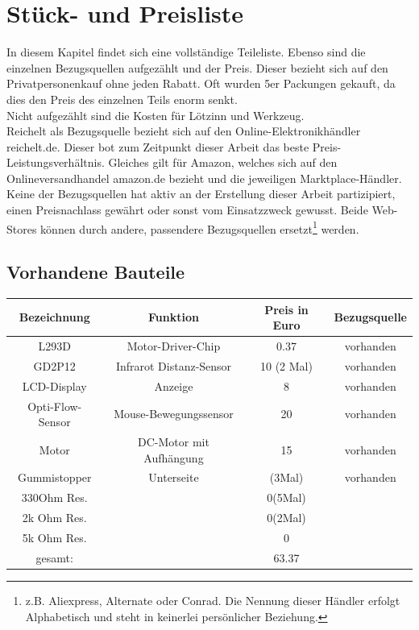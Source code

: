 \documentclass[twoside,11pt, a4paper]{report}
\begin{document}
	\chapter{Stück- und Preisliste}
	In diesem Kapitel findet sich eine vollständige Teileliste. Ebenso sind die einzelnen Bezugsquellen aufgezählt und der Preis. Dieser bezieht sich auf den Privatpersonenkauf ohne jeden Rabatt. Oft wurden 5er Packungen gekauft, da dies den Preis des einzelnen Teils enorm senkt. \\
	Nicht aufgezählt sind die Kosten für Lötzinn und Werkzeug. \\
	Reichelt als Bezugsquelle bezieht sich auf den Online-Elektronikhändler reichelt.de. Dieser bot zum Zeitpunkt dieser Arbeit das beste Preis-Leistungsverhältnis. Gleiches gilt für Amazon, welches sich auf den Onlineversandhandel amazon.de bezieht und die jeweiligen Marktplace-Händler. Keine der Bezugsquellen hat aktiv an der Erstellung dieser Arbeit partizipiert, einen Preisnachlass gewährt oder sonst vom Einsatzzweck gewusst.  Beide Web-Stores können durch andere, passendere Bezugsquellen ersetzt\footnote{z.B. Aliexpress, Alternate oder Conrad. Die Nennung dieser Händler erfolgt Alphabetisch und steht in keinerlei persönlicher Beziehung. } werden. 
	
	\section{Vorhandene Bauteile}
	\begin{center}
		\begin{tabular}{|c|c|c|c|}
			\hline
			Bezeichnung			&Funktion				& Preis	in Euro	&Bezugsquelle\\
			\hline
			L293D				&Motor-Driver-Chip		& 0.37			& vorhanden		\\
			GD2P12				&Infrarot Distanz-Sensor& 10 (2 Mal)	& vorhanden\\
			LCD-Display			&Anzeige				& 8				& vorhanden	\\
			Opti-Flow-Sensor	&Mouse-Bewegungssensor	& 20			& vorhanden\\
			Motor				& DC-Motor mit Aufhängung& 15			& vorhanden\\
			Gummistopper		& Unterseite			& (3Mal)		& vorhanden \\
			330Ohm Res.			&						& 0(5Mal)		& \\
			2k Ohm Res.			&						& 0(2Mal)		& \\
			5k Ohm Res.			&						& 0				& \\
			\hline
			gesamt:			&						&63.37&\\
			\hline
		\end{tabular}
	\end{center}
	
\end{document}
